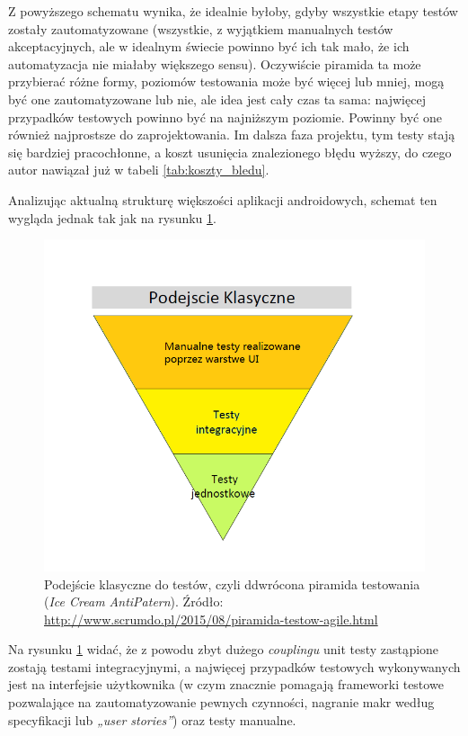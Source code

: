 \newpage
Z powyższego schematu wynika, że idealnie byłoby, gdyby wszystkie etapy testów zostały zautomatyzowane (wszystkie, z wyjątkiem manualnych testów akceptacyjnych, ale w idealnym świecie powinno być ich tak mało, że ich automatyzacja nie miałaby większego sensu). Oczywiście piramida ta może przybierać różne formy, poziomów testowania może być więcej lub mniej, mogą być one zautomatyzowane lub nie, ale idea jest cały czas ta sama: najwięcej przypadków testowych powinno być na najniższym poziomie. Powinny być one również najprostsze do zaprojektowania. Im dalsza faza projektu, tym testy stają się bardziej pracochłonne, a koszt usunięcia znalezionego błędu wyższy, do czego autor nawiązał już w tabeli \ref{tab:koszty_bledu}.

Analizując aktualną strukturę większości aplikacji androidowych, schemat ten wygląda jednak tak jak na rysunku \ref{fig:odwrocona_piramida}.

\begin{figure}[!htb]
    \centering
    \includegraphics[width=12cm]{imgs/ch3_odwrocona_piramida.png}
    \caption
{Podejście klasyczne do testów, czyli ddwrócona piramida testowania (\textit{Ice Cream AntiPatern}). Źródło: \url{http://www.scrumdo.pl/2015/08/piramida-testow-agile.html}}
    \label{fig:odwrocona_piramida}
\end{figure} 

\newpage
Na rysunku \ref{fig:odwrocona_piramida} widać, że z powodu zbyt dużego \textit{couplingu} unit testy zastąpione zostają testami integracyjnymi, a najwięcej przypadków testowych wykonywanych jest na interfejsie użytkownika (w czym znacznie pomagają frameworki testowe pozwalające na zautomatyzowanie pewnych czynności, nagranie makr według specyfikacji lub \textit{„user stories”}) oraz testy manualne.

